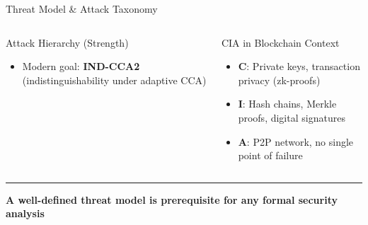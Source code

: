 \documentclass[8pt,aspectratio=169]{beamer}
\newcommand{\bottomnote}[1]{\vfill\vspace{-2mm}\textcolor{mllavender2}{\rule{\textwidth}{0.4pt}}\vspace{1mm}\footnotesize\textbf{#1}}
\begin{document}
\begin{frame}{Threat Model \& Attack Taxonomy}
\begin{columns}
\begin{block}{Attack Hierarchy (Strength)}
\begin{itemize}
  \item Modern goal: \textbf{IND-CCA2} (indistinguishability under adaptive CCA)
\end{itemize}
\end{block}
\begin{block}{CIA in Blockchain Context}
\begin{itemize}\small
  \item \textbf{C}: Private keys, transaction privacy (zk-proofs)
  \item \textbf{I}: Hash chains, Merkle proofs, digital signatures
  \item \textbf{A}: P2P network, no single point of failure
\end{itemize}
\end{block}
\end{columns}
\bottomnote{A well-defined threat model is prerequisite for any formal security analysis}
\end{frame}
\end{document}
